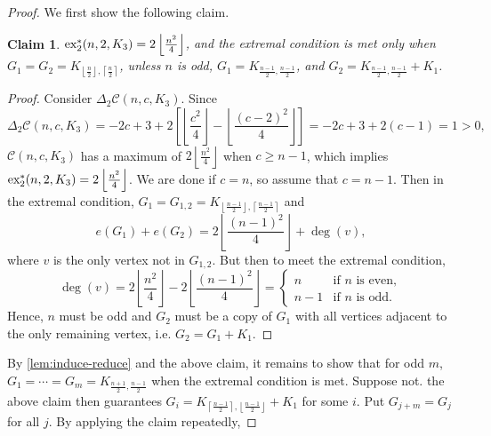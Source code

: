 \documentclass[12pt]{report}
\newtheorem{claim}{Claim}[theorem]
\newcommand*{\dex}{\textnormal{ex}_2}
\newcommand*{\con}{\mathcal{C}}
\begin{document}
\begin{proof}
  
  We first show the following claim.

  \begin{claim}\label{claim:induce-triangle}
    $\dex^*(n, 2, K_3) = 2\left\lfloor\frac{n^2}{4}\right\rfloor$, and the extremal condition is met only when $G_1 = G_2 = K_{\left\lfloor\frac{n}{2}\right\rfloor, \left\lceil\frac{n}{2}\right\rceil}$, unless $n$ is odd, $G_1 = K_{\frac{n - 1}{2}, \frac{n - 1}{2}}$, and $G_2 = K_{\frac{n - 1}{2}, \frac{n - 1}{2}} + K_1$.
  \end{claim}

  \begin{proof}
    Consider $\Delta_2 \con(n, c, K_3)$. Since
    \[
      \Delta_2 \con(n, c, K_3) = -2c + 3 + 2\left[\left\lfloor\frac{c^2}{4}\right\rfloor - \left\lfloor\frac{(c - 2)^2}{4}\right\rfloor\right] = -2c + 3 + 2(c - 1) = 1 > 0,
    \]
    $\con(n, c, K_3)$ has a maximum of $2\left\lfloor \frac{n^2}{4} \right\rfloor$ when $c \geq n - 1$, which implies $\dex^*(n, 2, K_3) = 2\left\lfloor\frac{n^2}{4}\right\rfloor$. We are done if $c = n$, so assume that $c = n - 1$. Then in the extremal condition, $G_1 = G_{1, 2} = K_{\left\lfloor\frac{n - 1}{2}\right\rfloor, \left\lceil\frac{n - 1}{2}\right\rceil}$ and
    \[
      e(G_1) + e(G_2) = 2\left\lfloor\frac{(n - 1)^2}{4}\right\rfloor + \deg(v),
    \]
    where $v$ is the only vertex not in $G_{1, 2}$. But then to meet the extremal condition, 
    \[
      \deg(v) = 2\left\lfloor\frac{n^2}{4}\right\rfloor - 2\left\lfloor\frac{(n - 1)^2}{4}\right\rfloor = \begin{cases}
        n & \text{if $n$ is even}, \\
        n - 1 & \text{if $n$ is odd}.
      \end{cases}
    \]
    Hence, $n$ must be odd and $G_2$ must be a copy of $G_1$ with all vertices adjacent to the only remaining vertex, i.e. $G_2 = G_1 + K_1$.
  \end{proof}
  By \cref{lem:induce-reduce} and the above claim, it remains to show that for odd $m$, $G_1 = \cdots = G_m = K_{\frac{n + 1}{2}, \frac{n - 1}{2}}$ when the extremal condition is met. Suppose not. the above claim then guarantees $G_i = K_{\left\lceil\frac{n - 1}{2}\right\rceil, \left\lfloor\frac{n - 1}{2}\right\rfloor} + K_1$ for some $i$. Put $G_{j + m} = G_j$ for all $j$. By applying the claim repeatedly, 

\end{proof}
\end{document}
